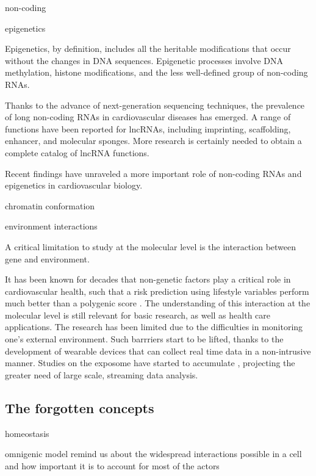 \documentclass[letter]{bioinfo}
\begin{document}
non-coding

epigenetics

Epigenetics, by definition, includes all the heritable modifications that occur without the changes in DNA sequences. Epigenetic processes involve DNA methylation, histone modifications, and the less well-defined group of non-coding RNAs.

Thanks to the advance of next-generation sequencing techniques, the prevalence of long non-coding RNAs in cardiovascular diseases has emerged. A range of functions have been reported for lncRNAs, including imprinting, scaffolding, enhancer, and molecular sponges. More research is certainly needed to obtain a complete catalog of lncRNA functions.


Recent findings have unraveled a more important role of non-coding RNAs and epigenetics in cardiovascular biology.

chromatin conformation \citep{Rosa-Garrido:2017:HighResolution}

environment interactions

A critical limitation to study at the molecular level is the interaction between gene  and environment.

It has been known for decades that non-genetic factors play a critical role in cardiovascular health, such that a risk prediction using lifestyle variables perform much better than a polygenic score \citep{Joyner:2011:Ten}. The understanding of this interaction at the molecular level is still relevant for basic research, as well as health care applications. The research has been limited due to the difficulties in monitoring one's external environment. Such barrriers start to be lifted, thanks to the development of wearable devices that can collect real time data in a non-intrusive manner. Studies on the exposome have started to accumulate \citep{Jiang:2018:Dynamic}, projecting the greater need of large scale, streaming data analysis.


\subsection{The forgotten concepts}

homeostasis

omnigenic model remind us about the widespread interactions possible in a cell and how important it is to account for most of the actors
\end{document}
